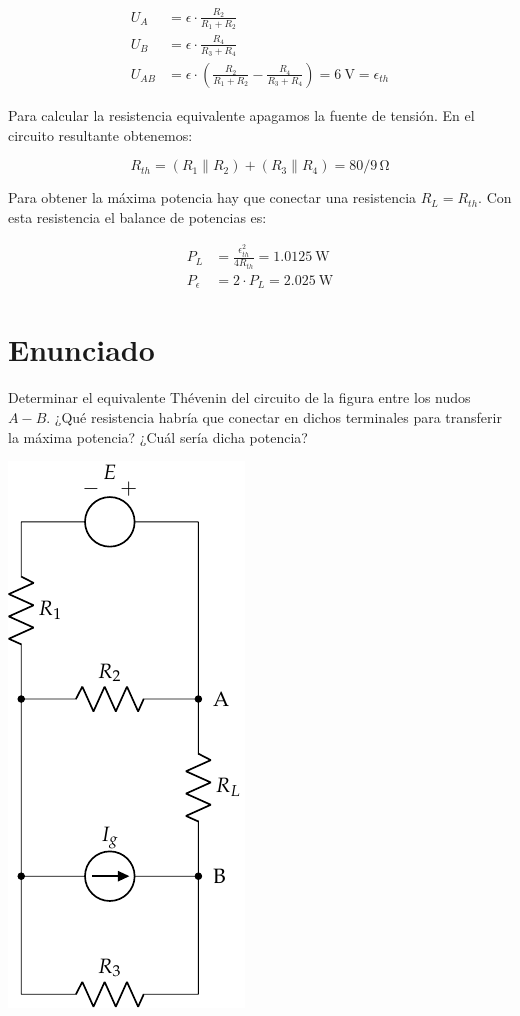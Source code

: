 \begin{align*}
  U_A &= \epsilon \cdot \frac{R_2}{R_1 + R_2}\\
  U_B &= \epsilon \cdot \frac{R_4}{R_3 + R_4}\\
  U_{AB} &= \epsilon \cdot (\frac{R_2}{R_1 + R_2} -  \frac{R_4}{R_3 + R_4}) = \qty{6}{\volt} = \epsilon_{th}
\end{align*}

Para calcular la resistencia equivalente apagamos la fuente de
tensión. En el circuito resultante obtenemos:

\begin{equation*}
  R_{th} = (R_1 \parallel R_2) + (R_3 \parallel R_4) = 80/9 \, \si{\ohm}
\end{equation*}

Para obtener la máxima potencia hay que conectar una resistencia
$R_L = R_{th}$. Con esta resistencia el balance de potencias es:

\begin{align*}
  P_L &= \frac{\epsilon_{th}^2}{4R_{th}} = \qty{1.0125}{\watt}\\
  P_\epsilon &= 2 \cdot P_L = \qty{2.025}{\watt}
\end{align*}


\section{Enunciado}
Determinar el equivalente Thévenin del circuito de la figura entre los
nudos $A-B$. ¿Qué resistencia habría que conectar en dichos terminales
para transferir la máxima potencia? ¿Cuál sería dicha potencia?

\begin{center}
  \includegraphics{figuras/BT1_17.pdf}
\end{center}

